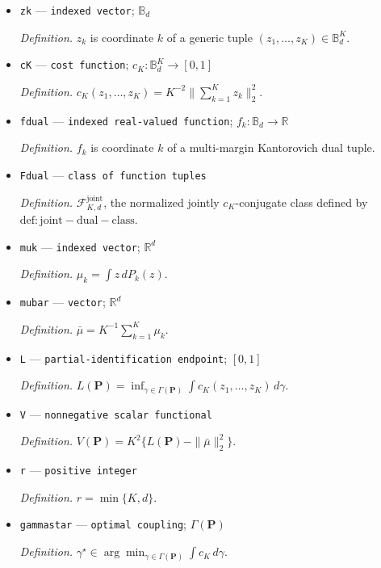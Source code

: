 \documentclass{article}
\begin{document}
\begin{itemize}
  \item \texttt{zk} --- \texttt{indexed vector}; \(\mathbb B_d\)
  \par\smallskip\noindent\emph{Definition.} \(z_k\) is coordinate \(k\) of a generic tuple \((z_1,\ldots,z_K)\in\mathbb B_d^K\).
  \item \texttt{cK} --- \texttt{cost function}; \(c_K:\mathbb B_d^K\to[0,1]\)
  \par\smallskip\noindent\emph{Definition.} \(c_K(z_1,\ldots,z_K)=K^{-2}\|\sum_{k=1}^K z_k\|_2^2\).
  \item \texttt{fdual} --- \texttt{indexed real-\allowbreak{}valued function}; \(f_k:\mathbb B_d\to\mathbb R\)
  \par\smallskip\noindent\emph{Definition.} \(f_k\) is coordinate \(k\) of a multi-margin Kantorovich dual tuple.
  \item \texttt{Fdual} --- \texttt{class of function tuples}
  \par\smallskip\noindent\emph{Definition.} \(\mathcal F_{K,d}^{\mathrm{joint}}\), the normalized jointly \(c_K\)-conjugate class defined by \(\mathrm{def:joint-dual-class}\).
  \item \texttt{muk} --- \texttt{indexed vector}; \(\mathbb R^d\)
  \par\smallskip\noindent\emph{Definition.} \(\mu_k=\int z\,dP_k(z)\).
  \item \texttt{mubar} --- \texttt{vector}; \(\mathbb R^d\)
  \par\smallskip\noindent\emph{Definition.} \(\bar\mu=K^{-1}\sum_{k=1}^K\mu_k\).
  \item \texttt{L} --- \texttt{partial-\allowbreak{}identification endpoint}; \([0,1]\)
  \par\smallskip\noindent\emph{Definition.} \(L(\mathbf P)=\inf_{\gamma\in\Gamma(\mathbf P)}\int c_K(z_1,\ldots,z_K)\,d\gamma\).
  \item \texttt{V} --- \texttt{nonnegative scalar functional}
  \par\smallskip\noindent\emph{Definition.} \(V(\mathbf P)=K^2\{L(\mathbf P)-\|\bar\mu\|_2^2\}\).
  \item \texttt{r} --- \texttt{positive integer}
  \par\smallskip\noindent\emph{Definition.} \(r=\min\{K,d\}\).
  \item \texttt{gammastar} --- \texttt{optimal coupling}; \(\Gamma(\mathbf P)\)
  \par\smallskip\noindent\emph{Definition.} \(\gamma^{\star}\in\arg\min_{\gamma\in\Gamma(\mathbf P)}\int c_K\,d\gamma\).

\end{itemize}
\end{document}
